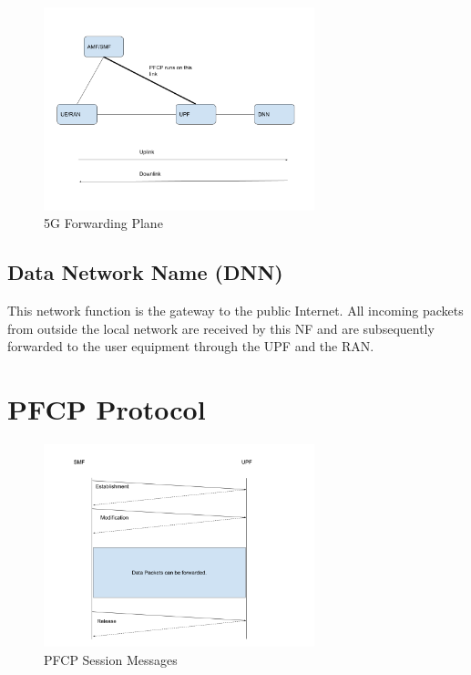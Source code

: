  \begin{figure}[htbp]
    \centering
    \includegraphics[width=0.7\textwidth, keepaspectratio]{./fig/Introduction/5GSecond.png}
    \caption{5G Forwarding Plane}
    \label{fig:5Gforwarding}
\end{figure}
\subsection{Data Network Name (DNN) \label{sec:DNN}}
This network function is the gateway to the public Internet. All incoming packets from outside the
 local network are received by this NF and are subsequently forwarded to the user equipment through
   the UPF and the RAN. 

\section {PFCP Protocol\label{sec:PFCP}}
 \begin{figure}[htbp]
    \centering
    \includegraphics[width=0.7\textwidth, keepaspectratio]{./fig/Introduction/PFCP.png}
    \caption{PFCP Session Messages}
    \label{fig:PFCP}
\end{figure}

